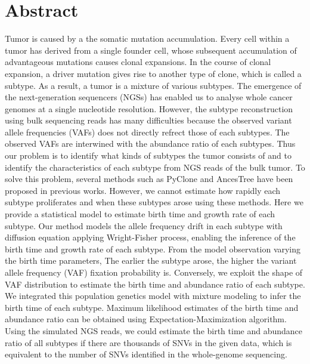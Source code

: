 \documentclass{article}
\begin{document}
\section*{Abstract}
Tumor is caused by a the somatic mutation accumulation. Every cell within a tumor has derived from a single founder cell, whose subsequent accumulation of advantageous mutations causes clonal expansions. In the course of clonal expansion, a driver mutation gives rise to another type of clone, which is called a subtype. As a result, a tumor is a mixture of various subtypes.
The emergence of the next-generation sequencers (NGSs) has enabled us to analyse whole cancer genomes at a single nucleotide resolution. However, the subtype reconstruction using bulk sequencing reads has many difficulties because the observed variant allele frequencies (VAFs) does not directly refrect those of each subtypes.
The observed VAFs are interwined with the abundance ratio of each subtypes.
 Thus our problem is to identify what kinds of subtypes the tumor consists of and to identify the characteristics of each subtype from NGS reads of the bulk tumor. To solve this problem, several methods such as PyClone and AncesTree have been proposed in previous works. However, we cannot estimate how rapidly each subtype proliferates and when these subtypes arose using these methods. Here we provide a statistical model to estimate birth time and growth rate of each subtype.
 Our method models the allele frequency drift in each subtype with diffusion equation applying Wright-Fisher process, enabling the inference of the birth time and growth rate of each subtype.
 From the model observation varying the birth time parameters, The earlier the subtype arose, the higher the variant allele frequency (VAF) fixation probability is.
 Conversely, we exploit the shape of VAF distribution to estimate the birth time and abundance ratio of each subtype.
 We integrated this population genetics model with mixture modeling to infer the birth time of each subtype. Maximum likelihood estimates of the birth time and abundance ratio can be obtained using Expectation-Maximization algorithm.
Using the simulated NGS reads, we could estimate the birth time and abundance ratio of all subtypes if there are thousands of SNVs in the given data, which is equivalent to the number of SNVs identified in the whole-genome sequencing.
\end{document}
